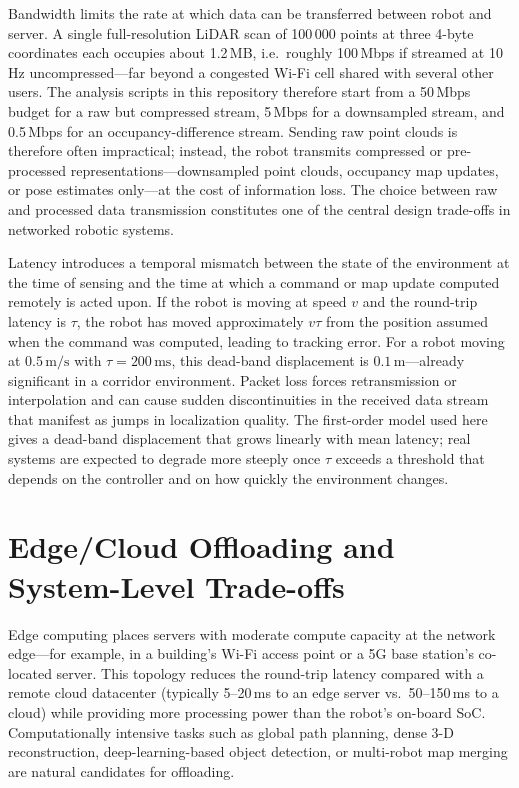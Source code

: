 Bandwidth limits the rate at which data can be transferred between robot and server.
A single full-resolution LiDAR scan of 100\,000 points at three 4-byte coordinates each
occupies about 1.2\,MB, i.e.\ roughly 100\,Mbps if streamed at 10\,Hz uncompressed---far
beyond a congested Wi-Fi cell shared with several other users. The analysis scripts in
this repository therefore start from a 50\,Mbps budget for a raw but compressed stream,
5\,Mbps for a downsampled stream, and 0.5\,Mbps for an occupancy-difference stream.
Sending raw point clouds is therefore often impractical; instead, the robot transmits
compressed or pre-processed representations---downsampled point clouds, occupancy map
updates, or pose estimates only---at the cost of information loss.
The choice between raw and processed data transmission constitutes one of the central
design trade-offs in networked robotic systems.

Latency introduces a temporal mismatch between the state of the environment at the
time of sensing and the time at which a command or map update computed remotely is
acted upon.
If the robot is moving at speed \(v\) and the round-trip latency is \(\tau\), the robot
has moved approximately \(v\tau\) from the position assumed when the command was
computed, leading to tracking error.
For a robot moving at \(0.5\,\text{m/s}\) with \(\tau = 200\,\text{ms}\), this dead-band
displacement is \(0.1\,\text{m}\)---already significant in a corridor environment.
Packet loss forces retransmission or interpolation and can cause sudden discontinuities
in the received data stream that manifest as jumps in localization quality.
The first-order model used here gives a dead-band displacement that grows linearly with
mean latency; real systems are expected to degrade more steeply once \(\tau\) exceeds a
threshold that depends on the controller and on how quickly the environment changes.

\section{Edge/Cloud Offloading and System-Level Trade-offs}

Edge computing places servers with moderate compute capacity at the network edge---for
example, in a building's Wi-Fi access point or a 5G base station's co-located server.
This topology reduces the round-trip latency compared with a remote cloud datacenter
(typically 5--20\,ms to an edge server vs.\ 50--150\,ms to a cloud) while providing
more processing power than the robot's on-board SoC.
Computationally intensive tasks such as global path planning, dense 3-D reconstruction,
deep-learning-based object detection, or multi-robot map merging are natural candidates
for offloading.


